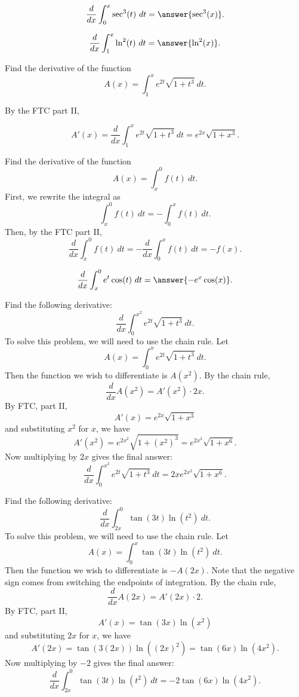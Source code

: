 \documentclass{ximera}
\begin{document}
\begin{problem}
\[\frac{d}{dx} \int_0^x \sec^3(t) \ dt = \answer{\sec^3(x)}.\]
\end{problem}

\begin{problem}
\[\frac{d}{dx} \int_1^x \ln^2(t) \ dt = \answer{\ln^2(x)}.\]
\end{problem}


\begin{example}
Find the derivative of the function 
\[A(x) = \int_1^x e^{2t}\sqrt{1+t^3} \ dt.\]

By the FTC part II,

 \[A'(x) = \frac{d}{dx}\int_1^x e^{2t}\sqrt{1+t^3} \ dt = e^{2x}\sqrt{1+x^3}.\]
\end{example} 

\begin{example}
Find the derivative of the function 
\[A(x) = \int_x^0 f(t) \ dt.\]
First, we rewrite the integral as
\[\int_x^0 f(t) \ dt =-\int_0^x f(t) \ dt.\]
Then, by the FTC part II,
\[\frac{d}{dx}\int_x^0 f(t) \ dt = -\frac{d}{dx}\int_0^x f(t) \ dt =-f(x).\] 
\end{example}

\begin{problem}
\[\frac{d}{dx} \int_x^0 e^t\cos(t) \ dt = \answer{-e^x\cos(x)}.\]
\end{problem}

  
\begin{example}
Find the following derivative:
\[\frac{d}{dx} \int_0^{x^2} e^{2t}\sqrt{1+t^3} \ dt.\]
To solve this problem, we will need to use the chain rule. Let 
\[A(x) = \int_0^x e^{2t}\sqrt{1+t^3} \ dt.\]
Then the function we wish to differentiate is $A(x^2)$.
By the chain rule, 
\[\frac{d}{dx} A(x^2) = A'(x^2) \cdot 2x.\]
By FTC, part II,
\[A'(x) = e^{2x}\sqrt{1+x^3}\]
and substituting $x^2$ for $x$, we have
\[A'(x^2) = e^{2x^2}\sqrt{1+(x^2)^3} = e^{2x^2}\sqrt{1+x^6}.\]
Now multiplying by $2x$ gives the final answer:
\[\frac{d}{dx}\int_0^{x^2} e^{2t}\sqrt{1+t^3} \ dt  = 
2xe^{2x^2}\sqrt{1+x^6}.\]
\end{example}

\begin{example} Find the following derivative:
\[\frac{d}{dx} \int_{2x}^0 \tan(3t) \ln(t^2) \ dt.\]
To solve this problem, we will need to use the chain rule. Let 
\[A(x) = \int_0^x \tan(3t) \ln(t^2) \ dt.\]
Then the function we wish to differentiate is $-A(2x)$.
Note that the negative sign comes from switching the endpoints of integration.
By the chain rule, 
\[\frac{d}{dx} A(2x) = A'(2x) \cdot 2.\]
By FTC, part II,
\[A'(x) = \tan(3x) \ln(x^2)\]
and substituting $2x$ for $x$, we have
\[A'(2x) = \tan(3(2x)) \ln((2x)^2) = \tan(6x) \ln(4x^2).\]
Now multiplying by $-2$ gives the final answer:
\[\frac{d}{dx} \int_{2x}^0 \tan(3t) \ln(t^2) \ dt  = -2\tan(6x)\ln(4x^2).\]
\end{example}
\end{document}
